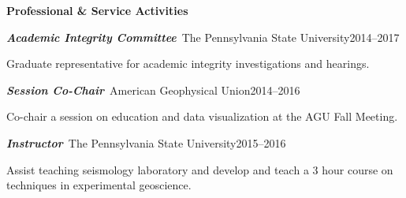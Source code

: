 \documentclass[11pt]{psuthesis}
\begin{document}
{\begin{singlespace}
\medskip

\large


%
%

\centerline{{\bf Professional \& Service Activities}}
\normalsize

\smallskip

\par\noindent
\textbf{\textit{Academic Integrity Committee}}\, The Pennsylvania State University\hfill 2014--2017

\smallskip

\par\noindent
\hspace{0.10truein}  
\parbox{5.7truein}{
\par\noindent
Graduate representative for academic integrity investigations and hearings.
}


\smallskip

\par\noindent
\textbf{\textit{Session Co-Chair}}\, American Geophysical Union\hfill 2014--2016

\smallskip

\par\noindent
\hspace{0.10truein}  
\parbox{5.7truein}{
\par\noindent
Co-chair a session on education and data visualization at the AGU Fall Meeting.
}



\smallskip

\par\noindent
\textbf{\textit{Instructor}}\, The Pennsylvania State University\hfill 2015--2016

\smallskip

\par\noindent
\hspace{0.10truein}  
\parbox{5.7truein}{
\par\noindent
Assist teaching seismology laboratory and develop and teach a 3 hour course on techniques in experimental geoscience.
}



\end{singlespace}
}
\end{document}
